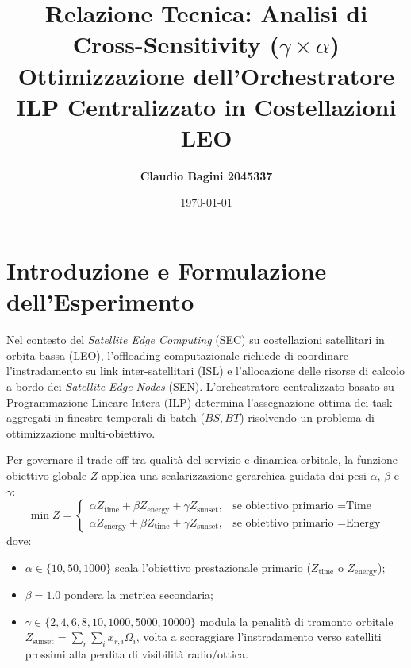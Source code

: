 \documentclass[11pt,a4paper]{article}
\title{\textbf{\Large Relazione Tecnica: Analisi di Cross-Sensitivity ($\gamma \times \alpha$)}\\[0.3em]\large Ottimizzazione dell'Orchestratore ILP Centralizzato in Costellazioni LEO}
\author{\textbf{Claudio Bagini 2045337}}
\date{\today}
\begin{document}
\maketitle

\section{Introduzione e Formulazione dell'Esperimento}
\label{sec:intro}

Nel contesto del \textit{Satellite Edge Computing} (SEC) su costellazioni satellitari in orbita bassa (LEO), l'offloading computazionale richiede di coordinare l'instradamento su link inter-satellitari (ISL) e l'allocazione delle risorse di calcolo a bordo dei \textit{Satellite Edge Nodes} (SEN). L'orchestratore centralizzato basato su Programmazione Lineare Intera (ILP) determina l'assegnazione ottima dei task aggregati in finestre temporali di batch ($BS, BT$) risolvendo un problema di ottimizzazione multi-obiettivo.

Per governare il trade-off tra qualità del servizio e dinamica orbitale, la funzione obiettivo globale $Z$ applica una scalarizzazione gerarchica guidata dai pesi $\alpha$, $\beta$ e $\gamma$:
\begin{equation}
    \min Z = \begin{cases}
        \alpha Z_{\text{time}} + \beta Z_{\text{energy}} + \gamma Z_{\text{sunset}}, & \text{se obiettivo primario } = \text{Time} \\
        \alpha Z_{\text{energy}} + \beta Z_{\text{time}} + \gamma Z_{\text{sunset}}, & \text{se obiettivo primario } = \text{Energy}
    \end{cases}
    \label{eq:objective}
\end{equation}
dove:
\begin{itemize}
    \item $\alpha \in \{10, 50, 1000\}$ scala l'obiettivo prestazionale primario ($Z_{\text{time}}$ o $Z_{\text{energy}}$);
    \item $\beta = 1.0$ pondera la metrica secondaria;
    \item $\gamma \in \{2, 4, 6, 8, 10, 1000, 5000, 10000\}$ modula la penalità di tramonto orbitale $Z_{\text{sunset}} = \sum_{r} \sum_{i} x_{r,i} \Omega_i$, volta a scoraggiare l'instradamento verso satelliti prossimi alla perdita di visibilità radio/ottica.
\end{itemize}
\end{document}
